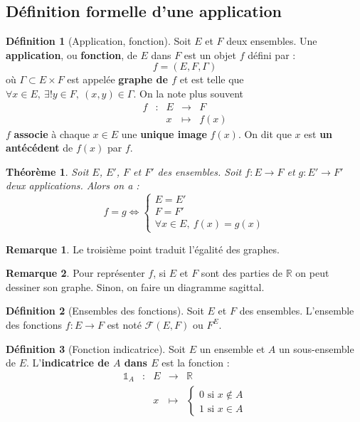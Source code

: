 \documentclass[french]{book}
\newcommand{\R}{\mathbb{R}}
\theoremstyle{plain}
\newtheorem{thm}{Théorème}[chapter]
\theoremstyle{definition}
\newtheorem{dfn}{Définition}[chapter]
\newtheorem{rmq}{Remarque}[chapter]
\theoremstyle{remark}
\begin{document}
\subsection{Définition formelle d'une application}
\begin{dfn}[Application, fonction]
	Soit $E$ et $F$ deux ensembles. Une \textbf{application}, ou \textbf{fonction}, de $E$ dans $F$ est un objet $f$ défini par : $$f=(E,F,\Gamma)$$ où $\Gamma\subset E\times F$ est appelée \textbf{graphe de $f$} et est telle que $\forall x\in E,\ \exists!y\in F,\ (x,y)\in\Gamma$. On la note plus souvent $$\begin{array}{ccccc}f&:&E&\rightarrow&F\\&&x&\mapsto&f(x)\end{array}$$ $f$ \textbf{associe} à chaque $x\in E$ une \textbf{unique image} $f(x)$. On dit que $x$ est \textbf{un antécédent} de $f(x)$ par $f$. 
\end{dfn}
\begin{thm}
	Soit $E$, $E'$, $F$ et $F'$ des ensembles. Soit $f:E\rightarrow F$ et $g:E'\rightarrow F'$ deux applications. Alors on a : $$f=g\iff \begin{cases}
		E=E' \\ F=F' \\ \forall x\in E,\ f(x)=g(x)
	\end{cases}$$
\end{thm}
\begin{rmq}
	Le troisième point traduit l'égalité des graphes.
\end{rmq}
\begin{rmq}
	Pour représenter $f$, si $E$ et $F$ sont des parties de $\R$ on peut dessiner son graphe. Sinon, on faire un diagramme sagittal.
\end{rmq}
\begin{dfn}[Ensembles des fonctions]
	Soit $E$ et $F$ des ensembles. L'ensemble des fonctions $f:E\rightarrow F$ est noté $\mathcal{F}(E,F)$ ou $F^E$.
\end{dfn}
\begin{dfn}[Fonction indicatrice]
	Soit $E$ un ensemble et $A$ un sous-ensemble de $E$. L'\textbf{indicatrice de $A$ dans $E$} est la fonction : $$\begin{array}{ccccc}\mathds{1}_A&:&E&\rightarrow&\R \\ &&x&\mapsto&\begin{cases}
			0\text{ si }x\notin A \\ 1\text{ si }x\in A
	\end{cases}\end{array}$$
\end{dfn}
\end{document}
